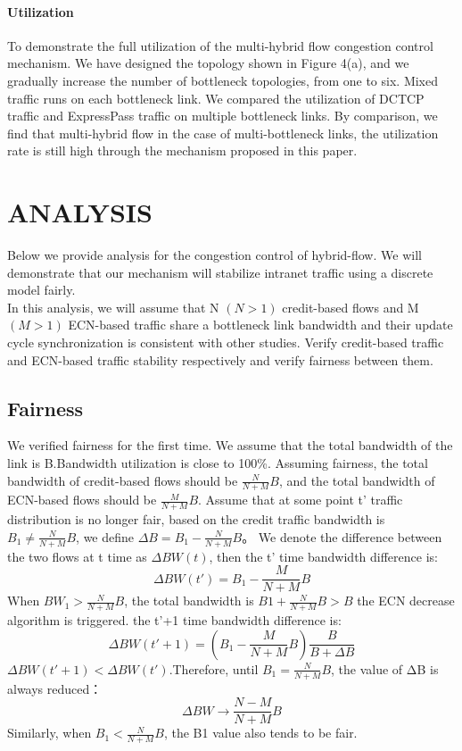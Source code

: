 \documentclass[conference]{IEEEtran}
\begin{document}
\paragraph{Utilization} To demonstrate the full utilization of the multi-hybrid flow congestion control mechanism. We have designed the topology shown in Figure 4(a), and we gradually increase the number of bottleneck topologies, from one to six. Mixed traffic runs on each bottleneck link. We compared the utilization of DCTCP traffic and ExpressPass traffic on multiple bottleneck links. By comparison, we find that multi-hybrid flow in the case of multi-bottleneck links, the utilization rate is still high through the mechanism proposed in this paper.
\section{ANALYSIS}
Below we provide analysis for the congestion control of hybrid-flow. We will demonstrate that our mechanism will stabilize intranet traffic using a discrete model fairly.\\
\indent In this analysis, we will assume that N $(N>1)$ credit-based flows and M$(M>1)$ ECN-based traffic share a bottleneck link bandwidth and their update cycle synchronization is consistent with other studies. Verify credit-based traffic and ECN-based traffic stability respectively and verify fairness between them.
\subsection{Fairness}
We verified fairness for the first time. We assume that the total bandwidth of the link is B.Bandwidth utilization is close to 100\%. Assuming fairness, the total bandwidth of credit-based flows should be $\frac{N}{N + M}B$, and the
total bandwidth of ECN-based flows should be $\frac{M}{N + M}B$. Assume that at some point t' traffic distribution is no longer fair, based on the credit traffic bandwidth is $B_1\not=\frac{N}{N + M}B$, we define $\Delta B= B_1-\frac{N}{N + M}B$。
We denote the difference between the two flows at t time as $\Delta BW(t)$, then the t' time bandwidth difference is:
\begin{equation}
\Delta BW(t')=B_1-\frac{M}{N+M}B
\end{equation}
\indent When $BW_1>\frac{N}{N + M}B$, the total bandwidth is $B1+\frac{N}{N + M}B>B$ the ECN decrease algorithm is triggered. the t'+1 time bandwidth difference is:
\begin{equation}
\Delta BW(t'+1)=(B_1-\frac{M}{N+M}B)\frac{B}{B+\Delta B}
\end{equation}
\indent $\Delta BW(t'+1)<\Delta BW(t')$.Therefore, until $B_1=\frac{N}{N + M}B$, the value of ΔB is always reduced：
\begin{equation}
\Delta BW \to \frac{N-M}{N+M}B
\end{equation}
Similarly, when $B_1<\frac{N}{N + M}B$, the B1 value also tends to be fair.
\end{document}
